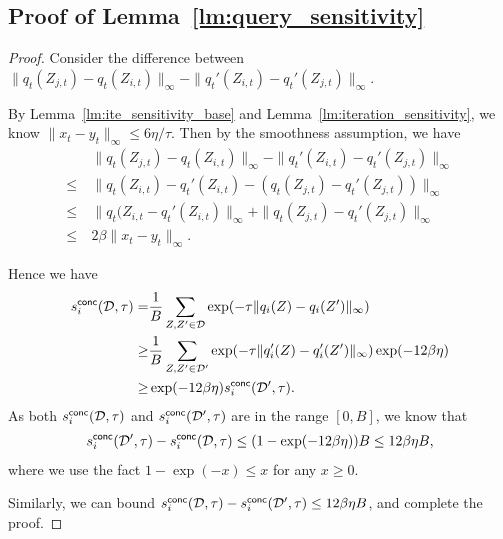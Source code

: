 \subsection{Proof of Lemma~\ref{lm:query_sensitivity}}
\querysensitivity*
\begin{proof}
Consider the difference between $\|q_t(Z_{j,t})-q_t(Z_{i,t})\|_\infty-\|q_t'(Z_{i,t})-q_t'(Z_{j,t})\|_\infty$.

By Lemma~\ref{lm:ite_sensitivity_base} and Lemma~\ref{lm:iteration_sensitivity}, we know $\|x_t-y_t\|_\infty\le 6\eta/\tau$. 
Then by the smoothness assumption, 
we have
\begin{align*}
& ~\|q_t(Z_{j,t})-q_t(Z_{i,t})\|_\infty-\|q_t'(Z_{i,t})-q_t'(Z_{j,t})\|_\infty\\
\le &~ \|q_t(Z_{i,t})-q_t'(Z_{i,t})-(q_t(Z_{j,t})-q_t'(Z_{j,t}))\|_\infty\\
\le &~ \|q_t(Z_{i,t}-q_t'(Z_{i,t})\|_\infty+\|q_t(Z_{j,t})-q_t'(Z_{j,t})\|_\infty\\
\le &~ 2\beta\|x_t-y_t\|_\infty.
\end{align*}


Hence we have
\begin{align*}
    s^{\mathsf{conc}}_i(\mathcal{D},\tau)=&\frac{1}{B}\sum_{Z,Z'\in\mathcal{D}}\exp(-\tau\|q_i(Z)-q_i(Z')\|_\infty)\\
    \ge & \frac{1}{B}\sum_{Z,Z'\in\mathcal{D}'}\exp(-\tau\|q_i'(Z)-q_i'(Z')\|_\infty)\exp(-12\beta\eta)\\
    \ge & \exp(-12\beta\eta)s^{\mathsf{conc}}_i(\mathcal{D}',\tau).
\end{align*}
As both $s^{\mathsf{conc}}_i(\mathcal{D},\tau)$ and $s^{\mathsf{conc}}_i(\mathcal{D}',\tau)$ are in the range $[0,B]$, we know that
\begin{align*}
    s^{\mathsf{conc}}_i(\mathcal{D}',\tau)-s^{\mathsf{conc}}_i(\mathcal{D},\tau)\le (1-\exp(-12\beta\eta))B\le 12\beta\eta B,
\end{align*}
where we use the fact $1-\exp(-x)\le x$ for any $x\ge 0$.
    
Similarly, we can bound $s^{\mathsf{conc}}_i(\mathcal{D},\tau)-s^{\mathsf{conc}}_i(\mathcal{D}',\tau)\le 12\beta\eta B$, and complete the proof.
\end{proof}


